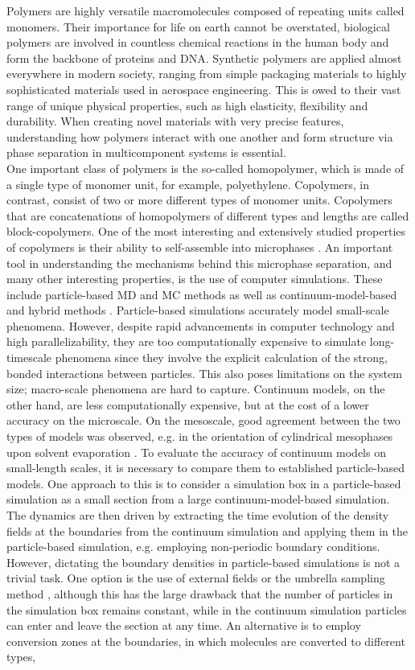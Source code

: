 \documentclass[bachelor,       %
               oneside,        %
               BCOR10mm,       %
               ngerman, english %
               ]{GAUBM}
\begin{document}
Polymers are highly versatile macromolecules composed of repeating units called monomers. Their importance for life on earth cannot be overstated, biological polymers are involved in countless chemical reactions in the human body and form the backbone of proteins and DNA. Synthetic polymers are applied almost everywhere in modern society, ranging from simple packaging materials to highly sophisticated materials used in aerospace engineering. This is owed to their vast range of unique physical properties, such as high elasticity, flexibility and durability. When creating novel materials with very precise features, understanding how polymers interact with one another and form structure via phase separation in multicomponent systems is essential.\\
One important class of polymers is the so-called homopolymer, which is made of a single type of monomer unit, for example, polyethylene. Copolymers, in contrast, consist of two or more different types of monomer units. Copolymers that are concatenations of homopolymers of different types and lengths are called block-copolymers. One of the most interesting and extensively studied properties of copolymers is their ability to self-assemble into microphases \cite{leibler1980theory}. An important tool in understanding the mechanisms behind this microphase separation, and many other interesting properties, is the use of computer simulations. These include particle-based \ac{MD} and \ac{MC} methods as well as continuum-model-based and hybrid methods \cite{Shuanhu2017}. Particle-based simulations accurately model small-scale phenomena. However, despite rapid advancements in computer technology and high parallelizability, they are too computationally expensive to simulate long-timescale phenomena since they involve the explicit calculation of the strong, bonded interactions between particles. This also poses limitations on the system size; macro-scale phenomena are hard to capture. Continuum models, on the other hand, are less computationally expensive, but at the cost of a lower accuracy on the microscale. On the mesoscale, good agreement between the two types of models was observed, e.g. in the orientation of cylindrical mesophases upon solvent evaporation \cite{Dreyer22}. To evaluate the accuracy of continuum models on small-length scales, it is necessary to compare them to established particle-based models. One approach to this is to consider a simulation box in a particle-based simulation as a small section from a large continuum-model-based simulation. The dynamics are then driven by extracting the time evolution of the density fields at the boundaries from the continuum simulation and applying them in the particle-based simulation, e.g. employing non-periodic boundary conditions. However, dictating the boundary densities in particle-based simulations is not a trivial task. One option is the use of external fields or the umbrella sampling method \cite{glenn74}, although this has the large drawback that the number of particles in the simulation box remains constant, while in the continuum simulation particles can enter and leave the section at any time. An alternative is to employ conversion zones at the boundaries, in which molecules are converted to different types, 
\end{document}

